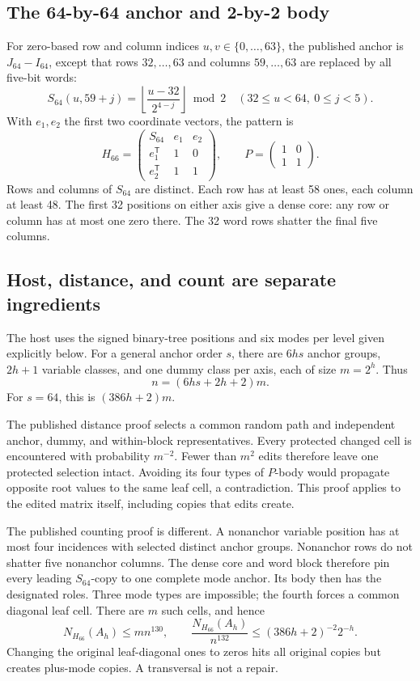 \documentclass[11pt,a4paper]{article}
\theoremstyle{remark}
\begin{document}
\subsection{The 64-by-64 anchor and 2-by-2 body}
For zero-based row and column indices \(u,v\in\{0,\ldots,63\}\), the
published anchor is \(J_{64}-I_{64}\), except that rows \(32,\ldots,63\)
and columns \(59,\ldots,63\) are replaced by all five-bit words:
\[
S_{64}(u,59+j)=
 \left\lfloor\frac{u-32}{2^{4-j}}\right\rfloor\bmod2
\quad(32\le u<64,\ 0\le j<5).
\]
With \(e_1,e_2\) the first two coordinate vectors, the pattern is
\[
H_{66}=
\begin{pmatrix}
S_{64}&e_1&e_2\\
e_1^{\mathsf T}&1&0\\
e_2^{\mathsf T}&1&1
\end{pmatrix},\qquad
P=\begin{pmatrix}1&0\\1&1\end{pmatrix}.
\]
Rows and columns of \(S_{64}\) are distinct. Each row has at least
58 ones, each column at least 48. The first 32 positions on either
axis give a dense core: any row or column has at most one zero there.
The 32 word rows shatter the final five columns.

\subsection{Host, distance, and count are separate ingredients}
The host uses the signed binary-tree positions and six modes per level
given explicitly below. For a general anchor order \(s\), there are
\(6hs\) anchor groups, \(2h+1\) variable classes, and one dummy class
per axis, each of size \(m=2^h\). Thus
\[
n=(6hs+2h+2)m.
\]
For \(s=64\), this is \((386h+2)m\).

The published distance proof selects a common random path and independent
anchor, dummy, and within-block representatives. Every protected changed
cell is encountered with probability \(m^{-2}\). Fewer than \(m^2\)
edits therefore leave one protected selection intact. Avoiding its four
types of \(P\)-body would propagate opposite root values to the same
leaf cell, a contradiction. This proof applies to the edited matrix
itself, including copies that edits create.

The published counting proof is different. A nonanchor variable position
has at most four incidences with selected distinct anchor groups.
Nonanchor rows do not shatter five nonanchor columns. The dense core and
word block therefore pin every leading \(S_{64}\)-copy to one complete
mode anchor. Its body then has the designated roles. Three mode types
are impossible; the fourth forces a common diagonal leaf cell.
There are \(m\) such cells, and hence
\[
N_{H_{66}}(A_h)\le mn^{130},\qquad
\frac{N_{H_{66}}(A_h)}{n^{132}}
\le (386h+2)^{-2}2^{-h}.
\]
Changing the original leaf-diagonal ones to zeros hits all original
copies but creates plus-mode copies. A transversal is not a repair.
\end{document}

